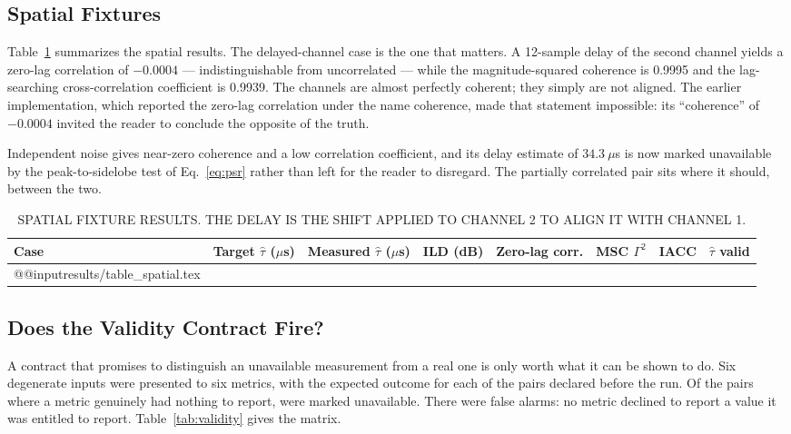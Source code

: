 \documentclass[final]{jaes}
\makeatletter
\newcommand{\inputrows}[1]{\csname @@input\endcsname #1 }
\makeatother
\begin{document}
\subsection{Spatial Fixtures}
\label{sec:spatial}

Table~\ref{tab:spatial} summarizes the spatial results. The delayed-channel case is the one that matters. A 12-sample delay of the second channel yields a zero-lag correlation of $-0.0004$ --- indistinguishable from uncorrelated --- while the magnitude-squared coherence is 0.9995 and the lag-searching cross-correlation coefficient is 0.9939. The channels are almost perfectly coherent; they simply are not aligned. The earlier implementation, which reported the zero-lag correlation under the name coherence, made that statement impossible: its ``coherence'' of $-0.0004$ invited the reader to conclude the opposite of the truth.

Independent noise gives near-zero coherence and a low correlation coefficient, and its delay estimate of $34.3~\mu$s is now marked unavailable by the peak-to-sidelobe test of Eq.~\eqref{eq:psr} rather than left for the reader to disregard. The partially correlated pair sits where it should, between the two.

\begin{table}[t]
\caption{SPATIAL FIXTURE RESULTS. THE DELAY IS THE SHIFT APPLIED TO CHANNEL 2 TO ALIGN IT WITH CHANNEL 1.}
\label{tab:spatial}
\centering
\small
\begin{tabular}{@{}lrrrrrrc@{}}
\toprule
Case & Target $\hat{\tau}$ ($\mu$s) & Measured $\hat{\tau}$ ($\mu$s) & ILD (dB) & Zero-lag corr. & MSC $\Gamma^2$ & IACC & $\hat{\tau}$ valid\\
\midrule
\inputrows{results/table_spatial.tex}
\bottomrule
\end{tabular}
\end{table}

\subsection{Does the Validity Contract Fire?}
\label{sec:validity}

A contract that promises to distinguish an unavailable measurement from a real one is only worth what it can be shown to do. Six degenerate inputs were presented to six metrics, with the expected outcome for each of the \valCases{} pairs declared before the run. Of the \valExpected{} pairs where a metric genuinely had nothing to report, \valCorrect{} were marked unavailable. There were \valFalseAlarms{} false alarms: no metric declined to report a value it was entitled to report. Table~\ref{tab:validity} gives the matrix.
\end{document}
